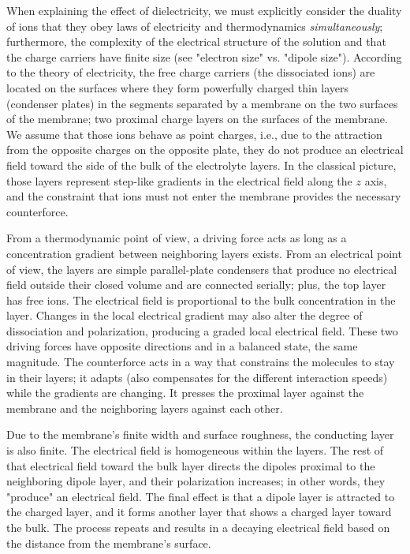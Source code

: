 When explaining the effect of dielectricity, we must explicitly consider the duality of ions that they obey laws of electricity and thermodynamics \textit{simultaneously}; furthermore, the complexity of the electrical structure of the solution and that the charge carriers have finite size (see "electron size" vs. "dipole size").
According to the theory of electricity, the free charge carriers (the dissociated ions) are located on the surfaces where they form powerfully charged thin layers (condenser plates) in the segments separated by a membrane on the two surfaces of the membrane; two proximal charge layers on the surfaces of the membrane.
We assume that those ions behave as point charges, i.e., 
due to the attraction from the opposite charges on the opposite plate,
they do not produce an electrical field toward
the side of the bulk of the electrolyte layers.
In the classical picture, those layers represent step-like gradients in the electrical field along the $z$ axis, and the constraint that ions must not enter the membrane provides the necessary counterforce.
\else

\fi


\ifx\magyar\undefined

From a thermodynamic point of view, a driving force acts
as long as a concentration gradient between neighboring layers exists. 
From an electrical point of view, the layers are simple parallel-plate condensers
that produce no electrical field outside their closed volume
and are connected serially; plus, the top layer has free ions. The electrical field is proportional to the bulk concentration in the layer.
Changes in the local electrical gradient may also alter the degree of dissociation and polarization, producing a graded local electrical field. 
These two driving forces have opposite directions
and in a balanced state, the same magnitude.
The counterforce acts in a way that constrains the molecules to stay in their layers; it adapts
(also compensates for the different interaction speeds)
while the gradients are changing. It presses the proximal layer against the membrane and the neighboring layers against each other.


Due to the membrane's finite width and surface roughness, the conducting layer is also finite. 
The electrical field is homogeneous within the layers. The rest of that electrical field toward the bulk layer directs the dipoles proximal to the neighboring dipole layer, and their polarization increases; in other words, they "produce" an electrical field.
The final effect is that a dipole layer is attracted to
the charged layer, and it forms another layer that shows 
a charged layer toward the bulk. 
The process repeats and results in 
a decaying electrical field based on the distance from the membrane's surface.
\else


